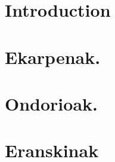 \documentclass[12pt,a4paper]{basque-book}
\renewcommand{\=}{"-}
\begin{document}
\part{Introduction}

 



%

\part{Ekarpenak.}




\part{Ondorioak.}





\part{Eranskinak}
\appendix

   
  


%



\backmatter
\nocite{*}



\printindex
\end{document}
